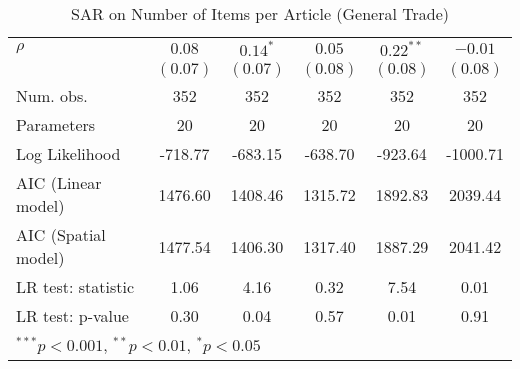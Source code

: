 \begin{table}[!h]
\begin{center}
\begin{tabular}{l c c c c c }
$\rho$                  & $0.08$       & $0.14^{*}$    & $0.05$       & $0.22^{**}$  & $-0.01$      \\
                        & $(0.07)$     & $(0.07)$      & $(0.08)$     & $(0.08)$     & $(0.08)$     \\
\midrule
Num. obs.               & 352          & 352           & 352          & 352          & 352          \\
Parameters              & 20           & 20            & 20           & 20           & 20           \\
Log Likelihood          & -718.77      & -683.15       & -638.70      & -923.64      & -1000.71     \\
AIC (Linear model)      & 1476.60      & 1408.46       & 1315.72      & 1892.83      & 2039.44      \\
AIC (Spatial model)     & 1477.54      & 1406.30       & 1317.40      & 1887.29      & 2041.42      \\
LR test: statistic      & 1.06         & 4.16          & 0.32         & 7.54         & 0.01         \\
LR test: p-value        & 0.30         & 0.04          & 0.57         & 0.01         & 0.91         \\
\bottomrule
\multicolumn{6}{l}{\scriptsize{$^{***}p<0.001$, $^{**}p<0.01$, $^*p<0.05$}}
\end{tabular}
\caption{SAR on Number of Items per Article (General Trade)}
\label{table:coefficients}
\end{center}
\end{table}
